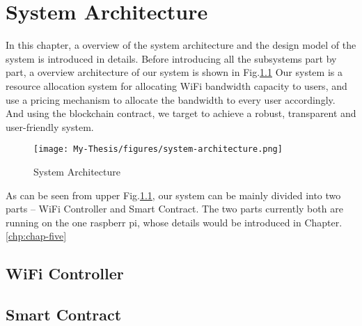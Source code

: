 \chapter{System Architecture}
\label{chp:chap-three}

In this chapter, a overview of the system architecture and the design model of the system is introduced in details. Before introducing all the subsystems part by part, a overview architecture of our system is shown in Fig.\ref{fig:system} Our system is a resource allocation system for allocating WiFi bandwidth capacity to users, and use a pricing mechanism to allocate the bandwidth to every user accordingly. And using the blockchain contract, we target to achieve a robust, transparent and user-friendly system.

\begin{figure}[h]
    \centering
    \texttt{[image: My-Thesis/figures/system-architecture.png]}    
    \caption{System Architecture}
    \label{fig:system}
\end{figure}

As can be seen from upper Fig.\ref{fig:system}, our system can be mainly divided into two parts -- WiFi Controller and Smart Contract. The two parts currently both are running on the one raspberr pi, whose details would be introduced in Chapter. \ref{chp:chap-five}

\section{WiFi Controller}

\section{Smart Contract}
